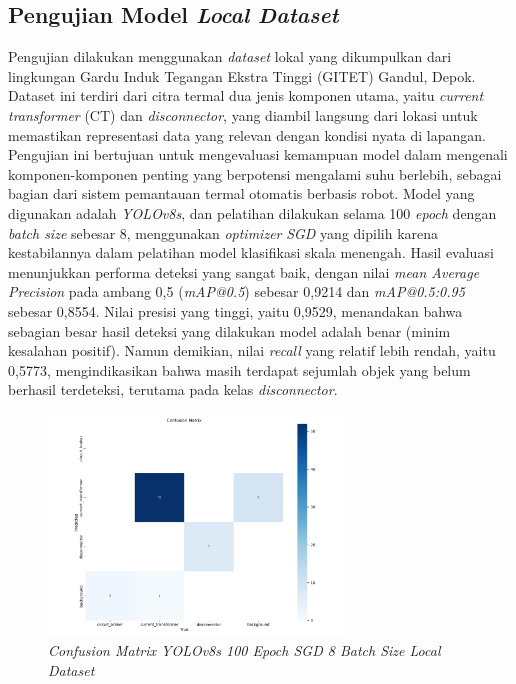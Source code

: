 \subsection{Pengujian Model \emph{Local Dataset}}
Pengujian dilakukan menggunakan \emph{dataset} lokal yang dikumpulkan dari lingkungan Gardu Induk Tegangan Ekstra Tinggi (GITET) Gandul, Depok. Dataset ini terdiri dari citra termal dua jenis komponen utama, yaitu \emph{current transformer} (CT) dan \emph{disconnector}, yang diambil langsung dari lokasi untuk memastikan representasi data yang relevan dengan kondisi nyata di lapangan. Pengujian ini bertujuan untuk mengevaluasi kemampuan model dalam mengenali komponen-komponen penting yang berpotensi mengalami suhu berlebih, sebagai bagian dari sistem pemantauan termal otomatis berbasis robot. Model yang digunakan adalah \emph{YOLOv8s}, dan pelatihan dilakukan selama 100 \emph{epoch} dengan \emph{batch size} sebesar 8, menggunakan \emph{optimizer} \emph{SGD} yang dipilih karena kestabilannya dalam pelatihan model klasifikasi skala menengah. Hasil evaluasi menunjukkan performa deteksi yang sangat baik, dengan nilai \emph{mean Average Precision} pada ambang 0{,}5 (\emph{mAP@0.5}) sebesar 0{,}9214 dan \emph{mAP@0.5:0.95} sebesar 0{,}8554. Nilai presisi yang tinggi, yaitu 0{,}9529, menandakan bahwa sebagian besar hasil deteksi yang dilakukan model adalah benar (minim kesalahan positif). Namun demikian, nilai \emph{recall} yang relatif lebih rendah, yaitu 0{,}5773, mengindikasikan bahwa masih terdapat sejumlah objek yang belum berhasil terdeteksi, terutama pada kelas \emph{disconnector}. 


\begin{figure}[H]
  \centering
  \includegraphics[width=0.7\textwidth]{gambar/bab4/cf_new.png}
  \caption{\emph{Confusion Matrix YOLOv8s 100 Epoch SGD 8 Batch Size Local Dataset}}
  \label{fig:conf_matrix_gitet}
\end{figure}


